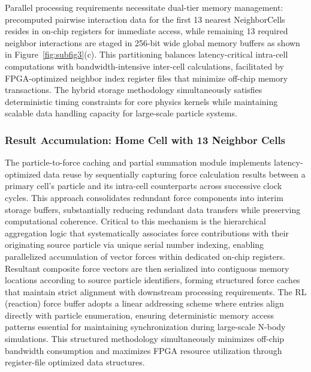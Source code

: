 \documentclass{article}
\begin{document}
\noindent
Parallel processing requirements necessitate dual-tier memory management: 
precomputed pairwise interaction data for the first 13 nearest NeighborCells 
resides in on-chip registers for immediate access, while remaining 13 required 
neighbor interactions are staged in 256-bit wide global memory buffers as shown 
in Figure~\ref{fig:subfig3}(c). 
This partitioning balances latency-critical intra-cell computations with 
bandwidth-intensive inter-cell calculations, facilitated by FPGA-optimized 
neighbor index register files that minimize off-chip memory transactions. 
The hybrid storage methodology simultaneously satisfies deterministic timing 
constraints for core physics kernels while maintaining scalable data handling 
capacity for large-scale particle systems.\\

\subsubsection{Result Accumulation: Home Cell with 13 Neighbor Cells}
\noindent
The particle-to-force caching and partial summation module implements 
latency-optimized data reuse by sequentially capturing force calculation 
results between a primary cell's particle and its intra-cell counterparts 
across successive clock cycles. 
This approach consolidates redundant force components into interim storage 
buffers, substantially reducing redundant data transfers while preserving 
computational coherence. 
Critical to this mechanism is the hierarchical aggregation logic that 
systematically associates force contributions with their originating source 
particle via unique serial number indexing, enabling parallelized accumulation 
of vector forces within dedicated on-chip registers.
Resultant composite force vectors are then serialized into contiguous memory 
locations according to source particle identifiers, forming structured force 
caches that maintain strict alignment with downstream processing requirements. 
The RL (reaction) force buffer adopts a linear addressing scheme where entries 
align directly with particle enumeration, ensuring deterministic memory access 
patterns essential for maintaining synchronization during large-scale N-body 
simulations.
This structured methodology simultaneously minimizes off-chip bandwidth 
consumption and maximizes FPGA resource utilization through register-file 
optimized data structures.\\
\end{document}
